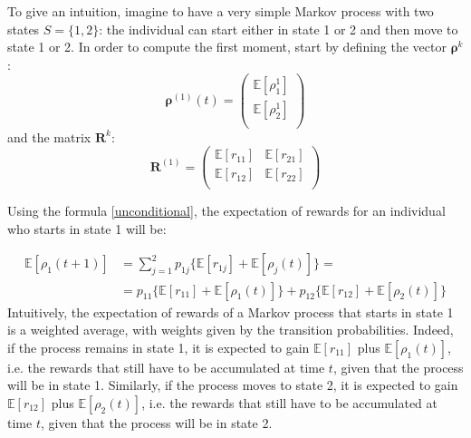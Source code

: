 \documentclass[\main/main.tex]{subfiles}
\begin{document}
To give an intuition, imagine to have a very simple Markov process with two states $S=\{1,2\}$: the individual can start either in state 1 or 2 and then move to state 1 or 2. In order to compute the first moment, start by defining the vector $ \bm{\rho}^{k}$:
\begin{equation}
 \bm{\rho}^{(1)} (t)=
\begin{pmatrix}
\mathds{E}[\rho^1_1]\\
\mathds{E}[\rho^1_2]\\
\end{pmatrix}
\end{equation}
and the matrix $\mathbf{R}^k$:
\begin{equation}
 \bm{R}^{(1)} =
\begin{pmatrix}
\mathds{E}[r_{11}] & \mathds{E}[r_{21}]\\
\mathds{E}[r_{12}] & \mathds{E}[r_{22}]\\
\end{pmatrix}
\end{equation}

\noindent Using the formula \ref{unconditional}, the expectation of rewards for an individual who starts in state 1 will be:

\begin{equation}
\begin{split}
  \mathds{E}[\rho_1(t+1)] &= \sum_{j=1}^2 p_{1j}\{ \mathds{E}[r_{1j}] + \mathds{E}[\rho_j(t)] \}=  \\
  &= p_{11}\{ \mathds{E}[r_{11}] + \mathds{E}[\rho_1(t)] \} + p_{12}\{ \mathds{E}[r_{12}] + \mathds{E}[\rho_2(t)] \}
\end{split}
\end{equation}
Intuitively, the expectation of rewards of a Markov process that starts in state 1 is a weighted average, with weights given by the transition probabilities. Indeed, if the process remains in state 1, it is expected to gain $\mathds{E}[r_{11}]$ plus $\mathds{E}[\rho_1(t)] $, i.e. the rewards that still have to be accumulated at time $t$, given that the process will be in state 1. Similarly, if the process moves to state 2, it is expected to gain $\mathds{E}[r_{12}]$ plus $\mathds{E}[\rho_2(t)] $, i.e. the rewards that still have to be accumulated at time $t$, given that the process will be in state 2.
\end{document}
